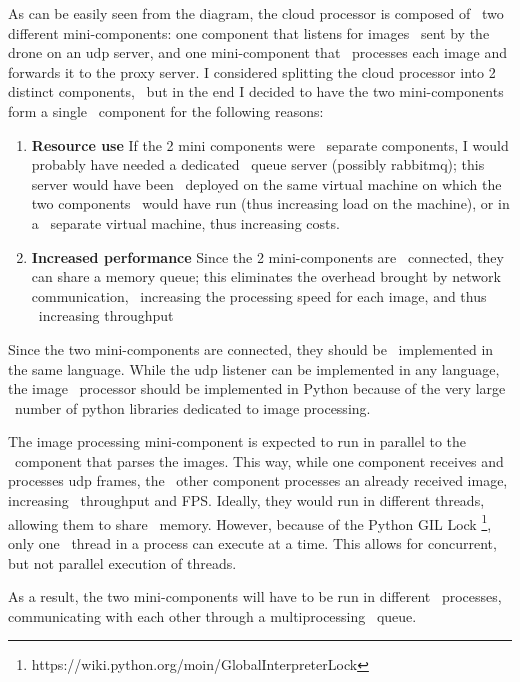 As can be easily seen from the diagram, the cloud processor is composed of \
two different mini-components: one component that listens for images \
sent by the drone on an udp server, and one mini-component that \
processes each image and forwards it to the proxy server.
I considered splitting the cloud processor into 2 distinct components, \
but in the end I decided to have the two mini-components form a single \
component for the following reasons:
\begin{enumerate}
    \item \textbf{Resource use} If the 2 mini components were \
            separate components, I would probably have needed a dedicated \
            queue server (possibly rabbitmq); this server would have been \
            deployed on the same virtual machine on which the two components \
            would have run (thus increasing load on the machine), or in a \
            separate virtual machine, thus increasing costs.
    \item \textbf{Increased performance} Since the 2 mini-components are \
            connected, they can share a memory queue;
            this eliminates the overhead brought by network communication, \
            increasing the processing speed for each image, and thus \
            increasing throughput
\end{enumerate}

Since the two mini-components are connected, they should be \
implemented in the same language.
While the udp listener can be implemented in any language, the image \
processor should be implemented in Python because of the very large \
number of python libraries dedicated to image processing.

The image processing mini-component is expected to run in parallel to the \
component that parses the images.
This way, while one component receives and processes udp frames, the \
other component processes an already received image, increasing \
throughput and FPS.
Ideally, they would run in different threads, allowing them to share \
memory.
However, because of the Python GIL Lock
\footnote{https://wiki.python.org/moin/GlobalInterpreterLock}, only one \
thread in a process can execute at a time.
This allows for concurrent, but not parallel execution of threads.

As a result, the two mini-components will have to be run in different \
processes, communicating with each other through a multiprocessing \
queue.

